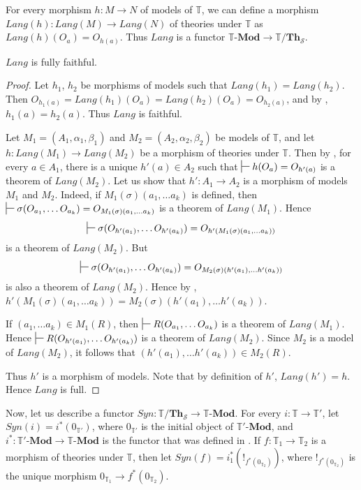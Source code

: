 \documentclass[reqno]{amsart}
\theoremstyle{definition}
\theoremstyle{remark}
\newcommand{\cat}[1]{\mathbf{#1}}
\newcommand{\Mod}[1]{#1\text{-}\cat{Mod}}
\newcommand{\Th}{\cat{Th}}
\numberwithin{figure}{section}
\begin{document}
For every morphism $h : M \to N$ of models of $\mathbb{T}$, we can define a morphism $Lang(h) : Lang(M) \to Lang(N)$ of theories under $\mathbb{T}$ as $Lang(h)(O_a) = O_{h(a)}$.
Thus $Lang$ is a functor $\Mod{\mathbb{T}} \to \mathbb{T}/\Th_\mathcal{S}$.

\begin{prop}[lang-ff]
$Lang$ is fully faithful.
\end{prop}
\begin{proof}
Let $h_1$, $h_2$ be morphisms of models such that $Lang(h_1) = Lang(h_2)$.
Then $O_{h_1(a)} = Lang(h_1)(O_a) = Lang(h_2)(O_a) = O_{h_2(a)}$, and by , $h_1(a) = h_2(a)$.
Thus $Lang$ is faithful.

Let $M_1 = (A_1,\alpha_1,\beta_1)$ and $M_2 = (A_2,\alpha_2,\beta_2)$ be models of $\mathbb{T}$,
    and let $h : Lang(M_1) \to Lang(M_2)$ be a morphism of theories under $\mathbb{T}$.
Then by , for every $a \in A_1$, there is a unique $h'(a) \in A_2$ such that $\sststile{}{} h(O_a) = O_{h'(a)}$ is a theorem of $Lang(M_2)$.
Let us show that $h' : A_1 \to A_2$ is a morphism of models $M_1$ and $M_2$.
Indeed, if $M_1(\sigma)(a_1, \ldots a_k)$ is defined, then $\sststile{}{} \sigma(O_{a_1}, \ldots O_{a_k}) = O_{M_1(\sigma)(a_1, \ldots a_k)}$ is a theorem of $Lang(M_1)$.
Hence \[ \sststile{}{} \sigma(O_{h'(a_1)}, \ldots O_{h'(a_k)}) = O_{h'(M_1(\sigma)(a_1, \ldots a_k))} \] is a theorem of $Lang(M_2)$.
But \[ \sststile{}{} \sigma(O_{h'(a_1)}, \ldots O_{h'(a_k)}) = O_{M_2(\sigma)(h'(a_1), \ldots h'(a_k))} \] is also a theorem of $Lang(M_2)$.
Hence by , $h'(M_1(\sigma)(a_1, \ldots a_k)) = M_2(\sigma)(h'(a_1), \ldots h'(a_k))$.

If $(a_1, \ldots a_k) \in M_1(R)$, then $\sststile{}{} R(O_{a_1}, \ldots O_{a_k})$ is a theorem of $Lang(M_1)$.
Hence $\sststile{}{} R(O_{h'(a_1)}, \ldots O_{h'(a_k)})$ is a theorem of $Lang(M_2)$.
Since $M_2$ is a model of $Lang(M_2)$, it follows that $(h'(a_1), \ldots h'(a_k)) \in M_2(R)$.

Thus $h'$ is a morphism of models.
Note that by definition of $h'$, $Lang(h') = h$.
Hence $Lang$ is full.
\end{proof}

Now, let us describe a functor $Syn : \mathbb{T}/\Th_\mathcal{S} \to \Mod{\mathbb{T}}$.
For every $i : \mathbb{T} \to \mathbb{T}'$, let $Syn(i) = i^*(0_{\mathbb{T}'})$, where $0_{\mathbb{T}'}$ is the initial object of $\Mod{\mathbb{T}'}$,
    and $i^* : \Mod{\mathbb{T}'} \to \Mod{\mathbb{T}}$ is the functor that was defined in \cite{alg-tt}.
If $f : \mathbb{T}_1 \to \mathbb{T}_2$ is a morphism of theories under $\mathbb{T}$, then let $Syn(f) = i_1^*(!_{f^*(0_{\mathbb{T}_2})})$,
    where $!_{f^*(0_{\mathbb{T}_2})}$ is the unique morphism $0_{\mathbb{T}_1} \to f^*(0_{\mathbb{T}_2})$.
\end{document}
